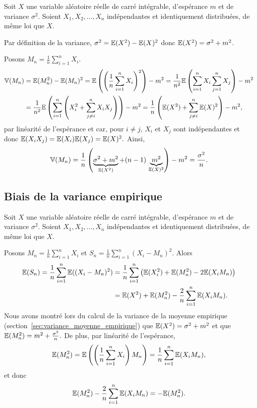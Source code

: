 Soit $X$ une variable aléatoire
réelle de carré intégrable, d'espérance $m$ et de variance $\sigma^2$. Soient
$X_1, X_2, \dots, X_n$ indépendantes et identiquement distribuées, de même loi
que $X$. 

Par définition de la variance, $\sigma^2 = \mathbb{E}(X^2) - \mathbb{E}(X)^2$ donc
$\mathbb{E}(X^2) = \sigma^2 + m^2$.

Posons $M_n = \frac1n \sum_{i=1}^n X_i.$
\begin{align*}
  \mathbb{V}(M_n) &= \mathbb{E}(M_n^2) - \mathbb{E}(M_n)^2 
   = \mathbb{E}\left(\left(\frac1n \sum_{i=1}^n X_i\right)^2\right) - m^2 
   = \frac1{n^2} \mathbb{E}\left( \sum_{i=1}^n X_i \sum_{j=1}^n X_j\right) - m^2 \\
  & = \frac1{n^2} \mathbb{E}\left( \sum_{i=1}^n \left(X_i^2 + \sum_{j \neq i }^n X_i X_j \right) \right) - m^2 
   = \frac1{n} \left(\mathbb{E}(X^2) + \sum_{j \neq i }^n \mathbb{E}(X)^2 \right) - m^2, 
\end{align*}
par linéarité de l'espérance et car, pour $i \neq j$, $X_i$ et $X_j$ sont indépendantes et donc $\mathbb{E}(X_iX_j) = \mathbb{E}(X_i) \mathbb{E}(X_j) = \mathbb{E}(X)^2.$
Ainsi,
\[
  \mathbb{V}(M_n) = \frac1{n} \left(\underbrace{\sigma^2 + m^2}_{\mathbb{E}(X^2)} + (n-1) \, \underbrace{m^2}_{\mathbb{E}(X)^2}  \right) - m^2 = \frac{\sigma^2}{n}.
\]

\subsection{Biais de la variance empirique} 
\label{sec:biais_variance_empirique}
Soit $X$ une variable aléatoire
réelle de carré intégrable, d'espérance $m$ et de variance $\sigma^2$. Soient
$X_1, X_2, \dots, X_n$ indépendantes et identiquement distribuées, de même loi
que $X$. 

Posons $M_n = \frac1n \sum_{i=1}^n X_i$ et $S_n = \frac1n \sum_{i=1}^n (X_i - M_n)^2.$ Alors
\begin{align*}
  \mathbb{E}(S_n) = \frac1n \sum_{i=1}^n \mathbb{E}((X_i - M_n)^2)  & =  
    \frac1n \sum_{i=1}^n \left( \mathbb{E}(X_i^2) +  \mathbb{E}(M_n^2) - 2 \mathbb{E}(X_i M_n) \right)  \\
  & = \mathbb{E}(X^2) + \mathbb{E}(M_n^2) - \frac2n \sum_{i=1}^n \mathbb{E}(X_i M_n).
\end{align*}
Nous avons montré lors du calcul de la variance de la moyenne empirique (section~\ref{sec:variance_moyenne_empirique}) que
$\mathbb{E}(X^2) = \sigma^2 + m^2$ et que $\mathbb{E}(M_n^2) = m^2 + \frac{\sigma^2}{n}.$
De plus, par linéarité de l'espérance,
\[
  \mathbb{E}(M_n^2) = \mathbb{E}\left( \left(\frac1n \sum_{i=1}^n X_i \right) M_n \right) = \frac1n \sum_{i=1}^n \mathbb{E}(X_i M_n),
\]
et donc 
\[
  \mathbb{E}(M_n^2) - \frac2n \sum_{i=1}^n \mathbb{E}(X_i M_n) = - \mathbb{E}(M_n^2).
\]


